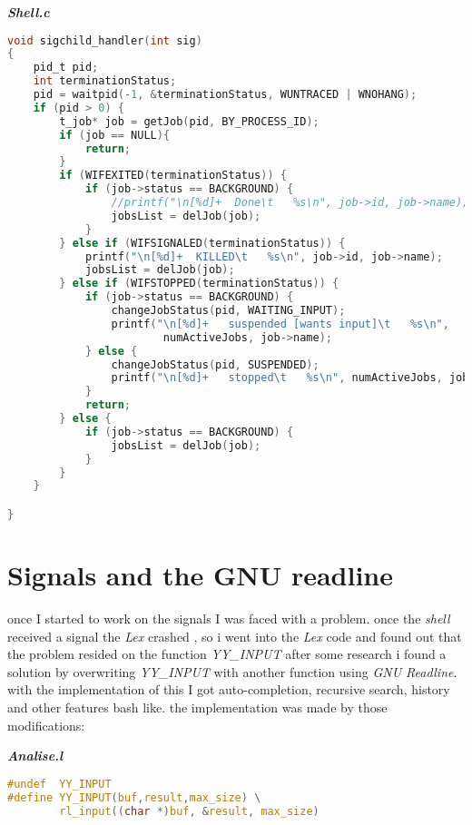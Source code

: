 \documentclass[paper=a4, fontsize=11pt]{scrartcl}
\numberwithin{equation}{section}		%
\numberwithin{figure}{section}			%
\numberwithin{table}{section}				%
\begin{document}
\textbf{\emph{Shell.c}}
\begin{lstlisting}[language=c]
void sigchild_handler(int sig)
{
    pid_t pid;
    int terminationStatus;
    pid = waitpid(-1, &terminationStatus, WUNTRACED | WNOHANG);
    if (pid > 0) {
        t_job* job = getJob(pid, BY_PROCESS_ID);
        if (job == NULL){
            return;
        }
        if (WIFEXITED(terminationStatus)) {
            if (job->status == BACKGROUND) {
                //printf("\n[%d]+  Done\t   %s\n", job->id, job->name);
                jobsList = delJob(job);
            }
        } else if (WIFSIGNALED(terminationStatus)) {
            printf("\n[%d]+  KILLED\t   %s\n", job->id, job->name);
            jobsList = delJob(job);
        } else if (WIFSTOPPED(terminationStatus)) {
            if (job->status == BACKGROUND) {
                changeJobStatus(pid, WAITING_INPUT);
                printf("\n[%d]+   suspended [wants input]\t   %s\n",
                        numActiveJobs, job->name);
            } else {
                changeJobStatus(pid, SUSPENDED);
                printf("\n[%d]+   stopped\t   %s\n", numActiveJobs, job->name);
            }
            return;
        } else {
            if (job->status == BACKGROUND) {
                jobsList = delJob(job);
            }
        }
    }

}
\end{lstlisting}

\section{Signals and the GNU readline}

once I started to work on the signals I was faced with a problem.
once the \emph{shell} received a signal the \emph{Lex} crashed , so i went into the \emph{Lex} code and found out that the problem resided on the function \emph{YY\_INPUT} after some research i found a solution by overwriting \emph{YY\_INPUT} with another function using \emph{GNU Readline}.
with the implementation of this I got auto-completion, recursive search, history and other features bash like.
the implementation was made by those modifications:


\textbf{\emph{Analise.l}}
\begin{lstlisting}[language=c]
#undef  YY_INPUT
#define YY_INPUT(buf,result,max_size) \
		rl_input((char *)buf, &result, max_size)
\end{lstlisting}
\end{document}
